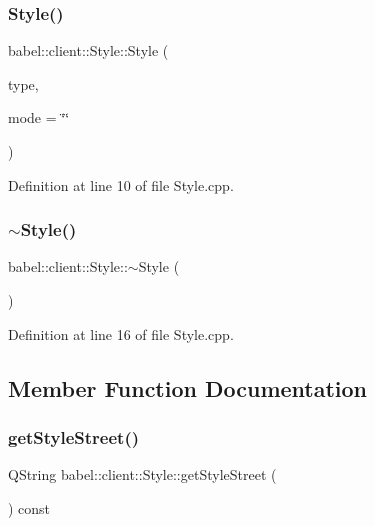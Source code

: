 \subsubsection{\texorpdfstring{Style()}{Style()}}
{\footnotesize\ttfamily babel\+::client\+::\+Style\+::\+Style (\begin{DoxyParamCaption}\item[{Q\+String}]{type,  }\item[{Q\+String}]{mode = {\ttfamily \char`\"{}\char`\"{}} }\end{DoxyParamCaption})}



Definition at line 10 of file Style.\+cpp.

\mbox{\label{classbabel_1_1client_1_1_style_a4c776d2129e16188dc18a12c77e69338}} 
\subsubsection{\texorpdfstring{$\sim$\+Style()}{~Style()}}
{\footnotesize\ttfamily babel\+::client\+::\+Style\+::$\sim$\+Style (\begin{DoxyParamCaption}{ }\end{DoxyParamCaption})}



Definition at line 16 of file Style.\+cpp.



\subsection{Member Function Documentation}
\mbox{\label{classbabel_1_1client_1_1_style_a41d762c7a488f1f1359e70d90939a64a}} 
\subsubsection{\texorpdfstring{get\+Style\+Street()}{getStyleStreet()}}
{\footnotesize\ttfamily Q\+String babel\+::client\+::\+Style\+::get\+Style\+Street (\begin{DoxyParamCaption}{ }\end{DoxyParamCaption}) const}



